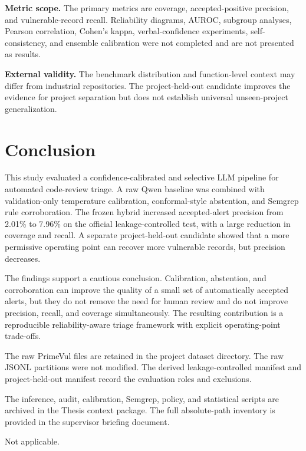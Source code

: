 \documentclass[pdflatex,sn-mathphys-num]{sn-jnl}
\begin{document}
\textbf{Metric scope.} The primary metrics are coverage, accepted-positive precision, and vulnerable-record recall. Reliability diagrams, AUROC, subgroup analyses, Pearson correlation, Cohen's kappa, verbal-confidence experiments, self-consistency, and ensemble calibration were not completed and are not presented as results.

\textbf{External validity.} The benchmark distribution and function-level context may differ from industrial repositories. The project-held-out candidate improves the evidence for project separation but does not establish universal unseen-project generalization.

\section{Conclusion}\label{sec:conclusion}

This study evaluated a confidence-calibrated and selective LLM pipeline for automated code-review triage. A raw Qwen baseline was combined with validation-only temperature calibration, conformal-style abstention, and Semgrep rule corroboration. The frozen hybrid increased accepted-alert precision from 2.01\% to 7.96\% on the official leakage-controlled test, with a large reduction in coverage and recall. A separate project-held-out candidate showed that a more permissive operating point can recover more vulnerable records, but precision decreases.

The findings support a cautious conclusion. Calibration, abstention, and corroboration can improve the quality of a small set of automatically accepted alerts, but they do not remove the need for human review and do not improve precision, recall, and coverage simultaneously. The resulting contribution is a reproducible reliability-aware triage framework with explicit operating-point trade-offs.

\backmatter

The raw PrimeVul files are retained in the project dataset directory. The raw JSONL partitions were not modified. The derived leakage-controlled manifest and project-held-out manifest record the evaluation roles and exclusions.

The inference, audit, calibration, Semgrep, policy, and statistical scripts are archived in the Thesis context package. The full absolute-path inventory is provided in the supervisor briefing document.

Not applicable.
\end{document}
